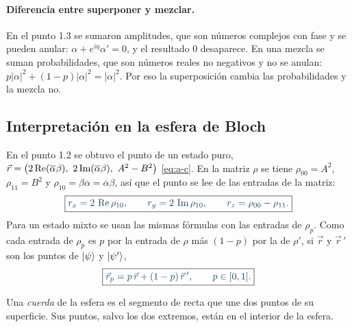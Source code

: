 \paragraph{Diferencia entre superponer y mezclar.} En el punto 1.3 se sumaron amplitudes, que son
números complejos con fase y se pueden anular: $\alpha+e^{i\eta}\alpha'=0$, y el resultado $0$
desaparece. En una mezcla se suman probabilidades, que son números reales no negativos y no se
anulan: $p|\alpha|^2+(1-p)|\alpha|^2=|\alpha|^2$. Por eso la superposición cambia las
probabilidades y la mezcla no.

\subsection*{Interpretación en la esfera de Bloch}

En el punto 1.2 se obtuvo el punto de un estado puro,
$\vec r=\bigl(2\Real(\overline\alpha\beta),\ 2\Imag(\overline\alpha\beta),\ A^2-B^2\bigr)$
\eqref{eq:a-c}. En la matriz $\rho$ se tiene $\rho_{00}=A^2$, $\rho_{11}=B^2$ y
$\rho_{10}=\beta\overline\alpha=\overline\alpha\beta$, así que el punto se lee de las entradas de
la matriz:
\begin{equation}\label{eq:14-bloch-matriz}
  \destacado{r_x=2\,\Real\rho_{10},\qquad
  r_y=2\,\Imag\rho_{10},\qquad
  r_z=\rho_{00}-\rho_{11}.}
\end{equation}
Para un estado mixto se usan las mismas fórmulas con las entradas de $\rho_p$. Como cada entrada
de $\rho_p$ es $p$ por la entrada de $\rho$ más $(1-p)$ por la de $\rho'$, si $\vec r$ y
$\vec r\,'$ son los puntos de $\lvert \psi\rangle$ y $\lvert \psi'\rangle$,
\begin{equation}\label{eq:14-segmento}
  \destacado{\vec r_p=p\,\vec r+(1-p)\,\vec r\,' ,\qquad p\in[0,1].}
\end{equation}

\begin{definicionT}[Cuerda]
Una \emph{cuerda} de la esfera es el segmento de recta que une dos puntos de su superficie. Sus
puntos, salvo los dos extremos, están en el interior de la esfera.
\end{definicionT}

